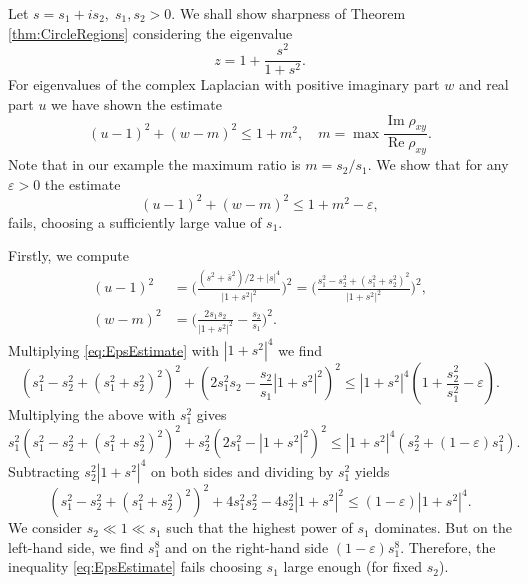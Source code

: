 \documentclass[a4paper,11pt]{amsart}
\theoremstyle{definition}
\renewcommand{\Re}{\operatorname{Re}}%
\renewcommand{\Im}{\operatorname{Im}}%
\begin{document}
 Let $s=s_1+is_2, \; s_1,s_2 >0$. We shall show sharpness of Theorem \ref{thm:CircleRegions} considering the eigenvalue
\begin{equation*}
z = 1 + \frac{s^2}{1+s^2}.
\end{equation*}
For eigenvalues of the complex Laplacian with positive imaginary part $w$ and real part $u$ we have shown the estimate
\begin{equation*}
(u-1)^2 + (w-m)^2 \leq 1 + m^2, \quad m = \max \frac{\Im \rho_{xy}}{\Re \rho_{xy}}.
\end{equation*}
Note that in our example the maximum ratio is $m= s_2/s_1$. We show that for any $\varepsilon>0$ the estimate
\begin{equation}
\label{eq:EpsEstimate}
(u-1)^2 + (w-m)^2 \leq 1 + m^2 - \varepsilon,
\end{equation}
fails, choosing a sufficiently large value of $s_1$.

Firstly, we compute
\begin{align*}
(u-1)^2 &= \big( \frac{(s^2 + \bar{s}^2)/2 + |s|^4}{|1+s^2|^2} \big)^2 = \big( \frac{s_1^2 - s_2^2 + (s_1^2+s_2^2)^2}{|1+s^2|^2} \big)^2, \\
(w-m)^2 &= \big( \frac{2s_1 s_2}{|1+s^2|^2} - \frac{s_2}{s_1} \big)^2.
\end{align*}
Multiplying \eqref{eq:EpsEstimate} with $|1+s^2|^4$ we find
\begin{equation*}
(s_1^2 - s_2^2 + (s_1^2 + s_2^2)^2)^2 + (2s_1^2 s_2 - \frac{s_2}{s_1} |1+s^2|^2)^2 \leq |1+s^2|^4 (1+ \frac{s_2^2}{s_1^2} - \varepsilon).
\end{equation*}
Multiplying the above with $s_1^2$ gives
\begin{equation*}
s_1^2(s_1^2 - s_2^2 + (s_1^2 + s_2^2)^2)^2 + s_2^2(2s_1^2 - |1+s^2|^2)^2 \leq |1+s^2|^4 (s_2^2 + (1-\varepsilon)s_1^2).
\end{equation*}
Subtracting $s_2^2 |1+s^2|^4$ on both sides and dividing by $s_1^2$ yields
\begin{equation*}
(s_1^2 - s_2^2 + (s_1^2 + s_2^2)^2 )^2 + 4s_1^2 s_2^2 - 4s_2^2 |1+s^2|^2 \leq (1-\varepsilon) |1+s^2|^4.
\end{equation*}
We consider $s_2 \ll 1 \ll s_1$ such that the highest power of $s_1$ dominates. But on the left-hand side, we find $s_1^8$ and on the right-hand side $(1-\varepsilon) s_1^8$. Therefore, the inequality \eqref{eq:EpsEstimate} fails choosing $s_1$ large enough (for fixed $s_2$).
\end{document}
